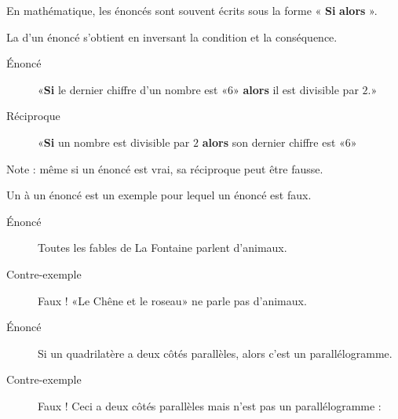 
En mathématique, les énoncés sont souvent écrits sous la forme « {\bf Si}  {\bf alors} ».

\begin{definition}
    La  d'un énoncé s'obtient en inversant la condition et la conséquence.
\end{definition}

\begin{example}
    \begin{description}
        \item[Énoncé] «{\bf Si} le dernier chiffre d'un nombre est «\( 6\)» {\bf alors} il est divisible par \( 2\).» 
        \item[Réciproque] «{\bf Si} un nombre est divisible par \( 2\) {\bf alors} son dernier chiffre est «\( 6\)» 
    \end{description}
    Note : même si un énoncé est vrai, sa réciproque peut être fausse.
\end{example}

\begin{definition}
    Un  à un énoncé est un exemple pour lequel un énoncé est faux.
\end{definition}

\begin{example}
    \begin{description}
        \item[Énoncé] Toutes les fables de La Fontaine parlent d'animaux.
        \item[Contre-exemple] Faux ! «Le Chêne et le roseau» ne parle pas d'animaux.
    \end{description}
\end{example}

\begin{example}
    \begin{description}
        \item[Énoncé] Si un quadrilatère a deux côtés parallèles, alors c'est un parallélogramme.
        \item[Contre-exemple] Faux ! Ceci a deux côtés parallèles mais n'est pas un parallélogramme :
            \begin{center}
               
            \end{center}
    \end{description}
\end{example}

